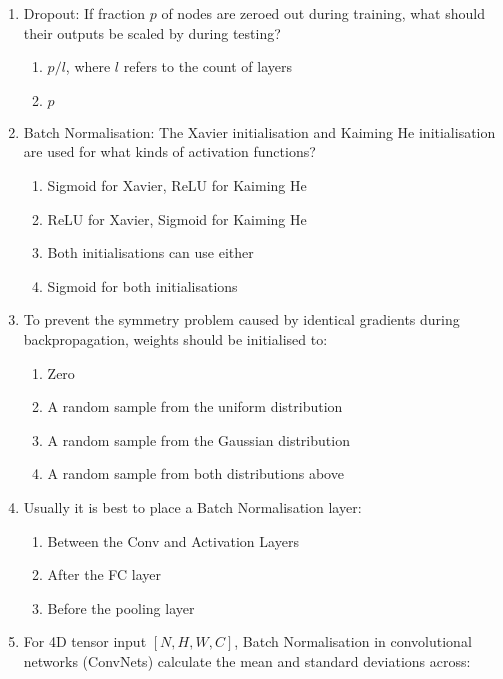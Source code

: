 \documentclass{report}
\numberwithin{equation}{section}
\begin{document}
\begin{enumerate}
\item Dropout: If fraction $p$ of nodes are zeroed out during training, what should their outputs be scaled by during testing?
\begin{enumerate}[label=\alph*.]
\item $p/l$, where $l$ refers to the count of layers
\item $p$
\end{enumerate}
\item Batch Normalisation: The Xavier initialisation and Kaiming He initialisation are used for what kinds of activation functions?
\begin{enumerate}[label=\alph*.]
\item Sigmoid for Xavier, ReLU for Kaiming He
\item ReLU for Xavier, Sigmoid for Kaiming He
\item Both initialisations can use either
\item Sigmoid for both initialisations
\end{enumerate}
\item To prevent the symmetry problem caused by identical gradients during backpropagation, weights should be initialised to:
\begin{enumerate}[label=\alph*.]
\item Zero
\item A random sample from the uniform distribution
\item A random sample from the Gaussian distribution
\item A random sample from both distributions above
\end{enumerate}
\item Usually it is best to place a Batch Normalisation layer:
\begin{enumerate}[label=\alph*.]
\item Between the Conv and Activation Layers
\item After the FC layer
\item Before the pooling layer
\end{enumerate}
\item For 4D tensor input $[N,H,W,C]$, Batch Normalisation in convolutional networks (ConvNets) calculate the mean and standard deviations across:

\end{enumerate}
\end{document}
